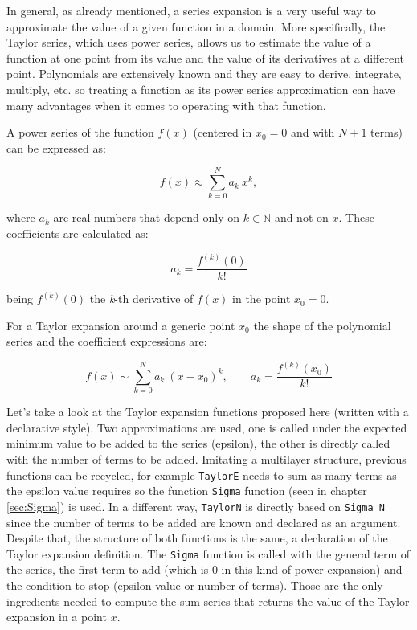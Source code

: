 In general, as already mentioned, a series expansion is a very useful way to approximate the value of a given function in a domain. More specifically, the Taylor series, which uses power series, allows us to estimate the value of a function at one point from its value and the value of its derivatives at a different point. Polynomials are extensively known and they are easy to derive, integrate, multiply, etc. so treating a function as its power series approximation can have many advantages when it comes to operating with that function.

A power series of the function $f(x)$ (centered in $x_0 = 0$ and with $N+1$ terms) can be expressed as:
 
\[  f(x) \approx \sum_{k=0} ^N a_k \  x^k,  \] 

where $a_k$ are real numbers that depend only on $k\in \mathbb{N}$ and not on $x$. These coefficients are calculated as:

$$
a_k = \frac{  f^{(k)} (0)  }{ k! }  
$$

being $f^{(k)} (0)$ the \textit{k}-th derivative of $f(x)$ in the point $x_0 = 0$.
 
For a Taylor expansion around a generic point $x_0$ the shape of the polynomial series and the coefficient expressions are:

\[  f(x) \sim \sum_{k=0} ^N a_k \  (x - x_0)^k, \qquad a_k = \frac{  f^{(k)} (x_0)  }{ k! }   \] 





Let's take a look at the Taylor expansion functions proposed here (written with a declarative style). Two approximations are used, one is called under the expected minimum value to be added to the series (epsilon), the other is directly called with the number of terms to be added. Imitating a multilayer structure, previous functions can be recycled, for example \texttt{TaylorE} needs to sum as many terms as the epsilon value requires so the function \texttt{Sigma} function (seen in chapter \ref{sec:Sigma}) is used. In a different way, \texttt{TaylorN} is directly based on \texttt{Sigma\_N} since the number of terms to be added are known and declared as an argument. 
Despite that, the structure of both functions is the same, a declaration of the Taylor expansion definition. The \texttt{Sigma} function is called with the general term of the series, the first term to add (which is 0 in this kind of power expansion) and the condition to stop (epsilon value or number of terms). Those are the only ingredients needed to compute the sum series that returns the value of the Taylor expansion in a point $x$. 
  
